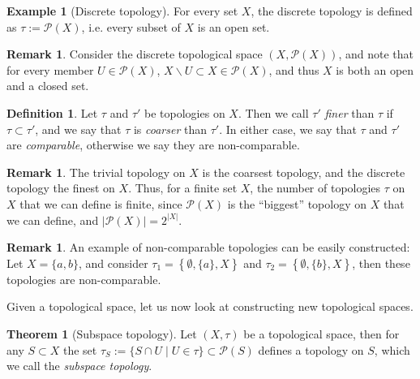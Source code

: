 \documentclass[12pt, a4paper]{article}
\numberwithin{equation}{section}
\theoremstyle{definition}
\theoremstyle{definition}
\newtheorem{defn}[thm]{Definition} %
\newtheorem{exmp}[thm]{Example} %
\newtheorem{remark}[thm]{Remark} %
\newtheorem{theorem}[thm]{Theorem}
\newcommand{\abs}[1]{\left\vert #1 \right\vert}
\begin{document}
		\begin{exmp}[Discrete topology]\label{exmp:discrete_topology}
			For every set $X$, the discrete topology is defined as $\tau := \mathcal P(X)$, i.e. every subset of $X$ is an open set.
		\end{exmp}
	
		\begin{remark}
			Consider the discrete topological space $(X, \mathscr P(X))$, and note that for every member $U\in \mathscr P(X)$, $X\backslash U\subset X\in \mathscr P(X)$, and thus $X$ is both an open and a closed set. 
		\end{remark}
	
		\begin{defn}\label{defn:comparison_of_topologies}
			Let $\tau$ and $\tau'$ be topologies on $X$. Then we call $\tau'$ \textit{finer} than $\tau$ if $\tau\subset\tau'$, and we say that $\tau$ is \textit{coarser} than $\tau'$. In either case, we say that $\tau$ and $\tau'$ are \textit{comparable}, otherwise we say they are non-comparable.
		\end{defn}
		
		\begin{remark}
			The trivial topology on $X$ is the coarsest topology, and the discrete topology the finest on $X$. Thus, for a finite set $X$, the number of topologies $\tau$ on $X$ that we can define is finite, since $\mathscr P(X)$ is the \enquote{biggest} topology on $X$ that we can define, and $\abs{\mathscr P(X)} = 2^{\abs{X}}$.
		\end{remark}
		
		\begin{remark}
			An example of non-comparable topologies can be easily constructed: Let $X = \{a, b\}$, and consider $\tau_1 = \left\{\emptyset, \{a\}, X\right\}$ and $\tau_2 = \left\{\emptyset, \{b\}, X\right\}$, then these topologies are non-comparable.
		\end{remark}
	
		Given a topological space, let us now look at constructing new topological spaces.
	
		\begin{theorem}[Subspace topology]
			Let $(X, \tau)$ be a topological space, then for any $S\subset X$ the set
			$\tau_S := \{S \cap U \mid U\in \tau\}\subset \mathcal P(S)$ defines a topology on $S$, which we call the \textit{subspace topology}.
		\end{theorem}
	
\end{document}
